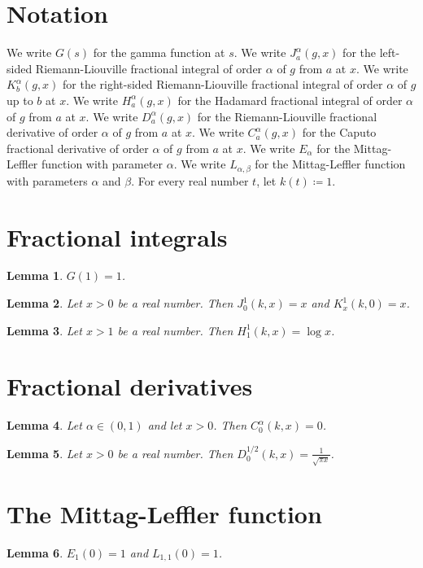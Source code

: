 \documentclass{article}
\newtheorem{lemma}{Lemma}
\begin{document}
\section{Notation}

We write $G(s)$ for the gamma function at $s$.
We write $J^{\alpha}_{a}(g,x)$ for the left-sided Riemann-Liouville fractional integral of order $\alpha$ of $g$ from $a$ at $x$.
We write $K^{\alpha}_{b}(g,x)$ for the right-sided Riemann-Liouville fractional integral of order $\alpha$ of $g$ up to $b$ at $x$.
We write $H^{\alpha}_{a}(g,x)$ for the Hadamard fractional integral of order $\alpha$ of $g$ from $a$ at $x$.
We write $D^{\alpha}_{a}(g,x)$ for the Riemann-Liouville fractional derivative of order $\alpha$ of $g$ from $a$ at $x$.
We write $C^{\alpha}_{a}(g,x)$ for the Caputo fractional derivative of order $\alpha$ of $g$ from $a$ at $x$.
We write $E_\alpha$ for the Mittag-Leffler function with parameter $\alpha$.
We write $L_{\alpha,\beta}$ for the Mittag-Leffler function with parameters $\alpha$ and $\beta$.
For every real number $t$, let $k(t)\coloneqq1$.

\section{Fractional integrals}

\begin{lemma}\label{gamma}
$G(1)=1$.
\end{lemma}

\begin{lemma}\label{left}
Let $x>0$ be a real number. Then $J^{1}_{0}(k,x)=x$ and $K^{1}_{x}(k,0)=x$.
\end{lemma}

\begin{lemma}\label{hadamard}
Let $x>1$ be a real number. Then $H^{1}_{1}(k,x)=\log x$.
\end{lemma}

\section{Fractional derivatives}

\begin{lemma}\label{caputo}
Let $\alpha\in(0,1)$ and let $x>0$. Then $C^{\alpha}_{0}(k,x)=0$.
\end{lemma}

\begin{lemma}\label{riemann}
Let $x>0$ be a real number. Then $D^{1/2}_{0}(k,x)=\frac{1}{\sqrt{\pi x}}$.
\end{lemma}

\section{The Mittag-Leffler function}

\begin{lemma}\label{mittag}
$E_1(0)=1$ and $L_{1,1}(0)=1$.
\end{lemma}
\end{document}
